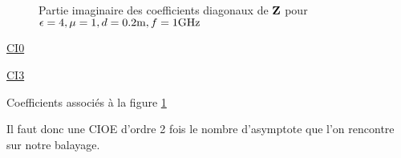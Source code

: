       \begin{figure}[!hbt]
          \centering
          
          \caption[CIOE sur empilement avec triple asymptote]{Partie imaginaire des coefficients diagonaux de \(\mathbf{Z}\) pour \(\epsilon = 4, \mu = 1, d=0.2\text{m}, f=1\text{GHz}\)}
          \label{fig:imp_fourier:plan:triple_asymptote:hoibc}
      \end{figure}
      \begin{table}[!hbt]
        \centering
        \begin{minipage}[t]{0.49\textwidth}
        \vspace{0pt}
        \centering
        \begin{coefftable}{\hyperlink{ci0}{CI0}}
          
        \end{coefftable}

        \begin{coefftable}{\hyperlink{ci3}{CI3}}
          
        \end{coefftable}
        \end{minipage}
        \caption{Coefficients associés à la figure \ref{fig:imp_fourier:plan:triple_asymptote:hoibc}}
        \label{tab:imp_fourier:plan:triple_asymptote:hoibc}
      \end{table}
      Il faut donc une CIOE d'ordre 2 fois le nombre d'asymptote que l'on rencontre sur notre balayage.

